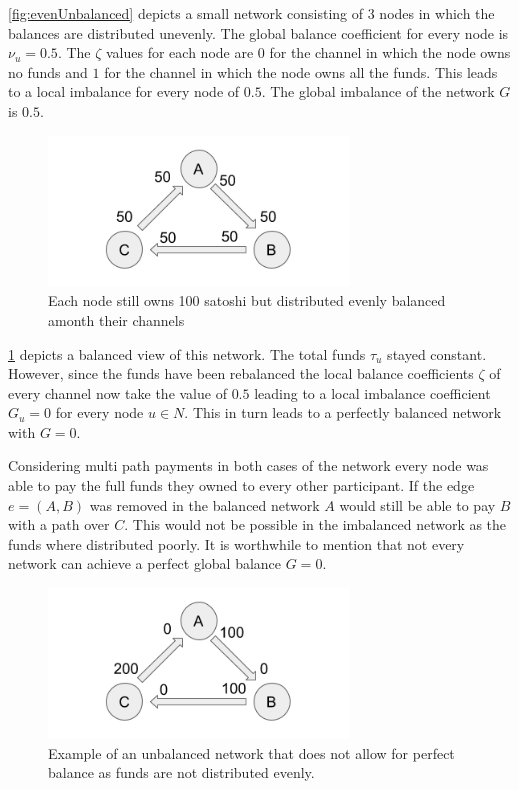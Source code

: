 \documentclass[a4paper]{paper}
\begin{document}
\cref{fig:evenUnbalanced} depicts a small network consisting of $3$ nodes in which the balances are distributed unevenly.
The global balance coefficient for every node is $\nu_u=0.5$.
The $\zeta$ values for each node are $0$ for the channel in which the node owns no funds and $1$ for the channel in which the node owns all the funds.
This leads to a local imbalance for every node of $0.5$. The global imbalance of the network $G$ is $0.5$.

\begin{figure}
 \centering
 \includegraphics[width=8cm]{img/evenBalanced.png}
 \caption{Each node still owns 100 satoshi but distributed evenly balanced amonth their channels}
 \label{fig:evenBalanced}
\end{figure}

\cref{fig:evenBalanced} depicts a balanced view of this network.
The total funds $\tau_u$ stayed constant.
However, since the funds have been rebalanced the local balance coefficients $\zeta$ of every channel now take the value of $0.5$ leading to a local imbalance coefficient $G_u=0$ for every node $u\in N$.
This in turn leads to a perfectly balanced network with $G=0$.

Considering multi path payments in both cases of the network every node was able to pay the full funds they owned to every other participant.
If the edge $e=(A,B)$ was removed in the balanced network $A$ would still be able to pay $B$ with a path over $C$.
This would not be possible in the imbalanced network as the funds where distributed poorly.
It is worthwhile to mention that not every network can achieve a perfect global balance $G=0$.

\begin{figure}
 \centering
 \includegraphics[width=8cm]{img/oddUnbalanced.png}
 \caption{Example of an unbalanced network that does not allow for perfect balance as funds are not distributed evenly.}
 \label{fig:oddUnbalanced}
\end{figure}
\end{document}
